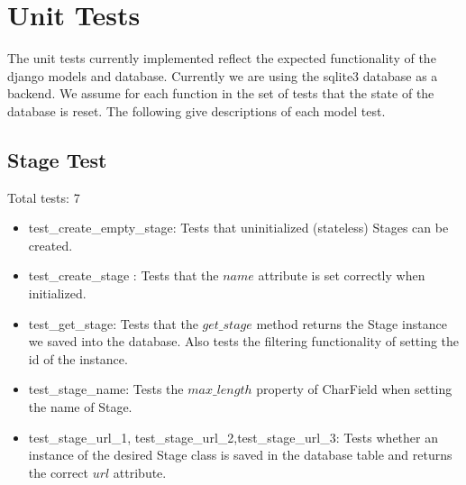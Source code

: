 \documentclass[12pt,english]{scrartcl}
\begin{document}
\section{Unit Tests}
The unit tests currently implemented reflect the expected functionality of the django models and database.
Currently we are using the sqlite3 database as a backend. We assume for each function in the set of tests that the state of the database is reset.
The following give descriptions of each model test.

\subsection{Stage Test}
Total tests: 7
\begin{itemize}
\item test\_create\_empty\_stage: Tests that uninitialized (stateless) Stages can be created.

\item test\_create\_stage : Tests that the $name$ attribute is set correctly when initialized.
 
\item test\_get\_stage: Tests that the $get\_stage$ method returns the Stage instance we saved into the database. Also tests the filtering functionality of setting the id of the instance.

\item test\_stage\_name: Tests the $max\_length$ property of CharField when setting the name of Stage.

\item test\_stage\_url\_1, test\_stage\_url\_2,test\_stage\_url\_3: Tests whether an instance of the desired Stage class 
is saved in the database table and returns the correct $url$ attribute. 
\end{itemize} 
\end{document}
